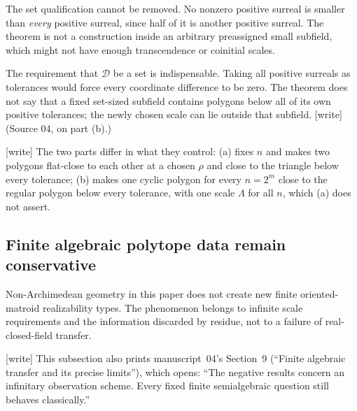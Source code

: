 \documentclass[11pt,a4paper]{article}
\numberwithin{equation}{section}
\theoremstyle{plain}
\newcommand{\wtag}{\textup{[write]}}%
\begin{document}
The set qualification cannot be removed. No nonzero positive surreal
is smaller than \emph{every} positive surreal, since half of it is
another positive surreal. The theorem is not a construction inside an
arbitrary preassigned small subfield, which might not have enough
transcendence or coinitial scales.

The requirement that $\mathcal D$ be a set is indispensable. Taking all
positive surreals as tolerances would force every coordinate difference
to be zero. The theorem does not say that a fixed set-sized subfield
contains polygons below all of its own positive tolerances; the newly
chosen scale can lie outside that subfield. \wtag{} (Source 04, on part (b).)

\wtag{} The two parts differ in what they control: (a) fixes $n$ and makes
two polygons flat-close to each other at a chosen $\rho$ and close to the
triangle below every tolerance; (b) makes one cyclic polygon for every
$n=2^m$ close to the regular polygon below every tolerance, with one scale
$\Lambda$ for all $n$, which (a) does not assert.

\subsection{Finite algebraic polytope data remain conservative}\label{poly:bao:sec:transfer}
Non-Archimedean geometry in this paper does not create new finite
oriented-matroid realizability types. The phenomenon belongs to infinite
scale requirements and the information discarded by residue, not to a
failure of real-closed-field transfer.

\wtag{} This subsection also prints manuscript~04's Section~9 (``Finite
algebraic transfer and its precise limits''), which opens: ``The negative
results concern an infinitary observation scheme. Every fixed finite
semialgebraic question still behaves classically.''
\end{document}
